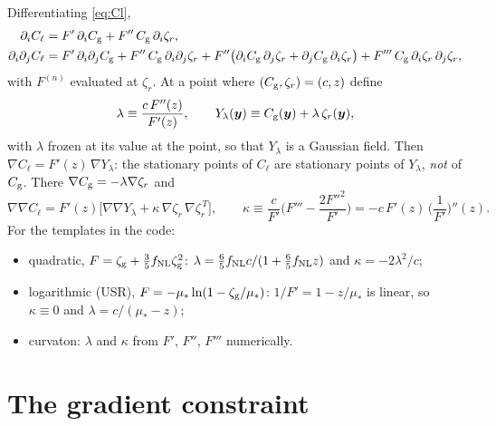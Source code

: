 \documentclass[11pt]{article}
\newcommand{\Cg}{C_{\rm g}}
\newcommand{\Cl}{C_{\ell}}
\newcommand{\zr}{\zeta_r}
\newcommand{\zg}{\zeta_{\rm g}}
\begin{document}
Differentiating \eqref{eq:Cl},
\begin{align}
\partial_i\Cl&=F'\,\partial_i\Cg+F''\,\Cg\,\partial_i\zr,\\
\partial_i\partial_j\Cl&=F'\,\partial_i\partial_j\Cg+F''\,\Cg\,\partial_i\partial_j\zr
+F''\big(\partial_i\Cg\,\partial_j\zr+\partial_j\Cg\,\partial_i\zr\big)
+F'''\,\Cg\,\partial_i\zr\,\partial_j\zr ,
\end{align}
with $F^{(n)}$ evaluated at $\zr$. At a point where $(\Cg,\zr)=(c,z)$ define
\begin{equation}
\lambda\equiv\frac{c\,F''(z)}{F'(z)},\qquad Y_\lambda(\bm y)\equiv\Cg(\bm y)+\lambda\,\zr(\bm y),
\label{eq:lambda}
\end{equation}
with $\lambda$ frozen at its value at the point, so that $Y_\lambda$ is a Gaussian field. Then
$\nabla\Cl=F'(z)\,\nabla Y_\lambda$: the stationary points of $\Cl$ are stationary points of
$Y_\lambda$, \emph{not} of $\Cg$. There $\nabla\Cg=-\lambda\nabla\zr$ and
\begin{equation}
\nabla\nabla\Cl=F'(z)\Big[\nabla\nabla Y_\lambda+\kappa\,\nabla\zr\,\nabla\zr^{\,T}\Big],\qquad
\kappa\equiv\frac{c}{F'}\Big(F'''-\frac{2F''^2}{F'}\Big)=-c\,F'(z)\,\Big(\frac1{F'}\Big)''(z).
\label{eq:kappa}
\end{equation}
For the templates in the code:
\begin{itemize}
\item quadratic, $F=\zg+\frac35f_{\rm NL}\zg^2$: $\lambda=\frac{6}{5}f_{\rm NL}c/(1+\frac65f_{\rm NL}z)$
and $\kappa=-2\lambda^2/c$;
\item logarithmic (USR), $F=-\mu_*\ln(1-\zg/\mu_*)$: $1/F'=1-z/\mu_*$ is linear, so
$\kappa\equiv0$ and $\lambda=c/(\mu_*-z)$;
\item curvaton: $\lambda$ and $\kappa$ from $F'$, $F''$, $F'''$ numerically.
\end{itemize}

\section{The gradient constraint}
\end{document}
